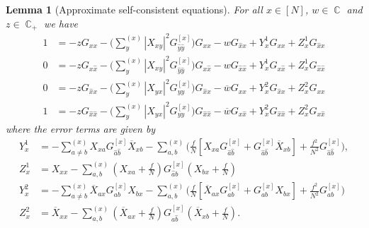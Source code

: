 \documentclass[11pt]{article}
\DeclareMathOperator{\CC}{\mathbb{C}}
\theoremstyle{plain}
\newtheorem{lemma}{Lemma}[section]
\theoremstyle{remark}
\numberwithin{equation}{section}
\newcommand*\barr[1]{\overline{#1}}
\newcommand*\bset[1]{[#1]}
\newcommand*\ubarr[1]{{\widehat{#1}}}
\begin{document}
	\begin{lemma}[Approximate self-consistent equations]\label{lem:ASCEq}
		For all $x\in[N]$, $w \in \CC$ and $z \in \CC_+$ we have
		\begin{align*}
			1 &= -z G_{xx} - \bigg(\sum_{y}^{(x)} |X_{xy}|^{2}G^{\bset{x}}_{\ubarr{y}\ubarr{y}}\bigg) G_{xx} - w G_{ \ubarr{x}x}+ Y^1_{x} G_{xx} + Z^{1}_{x}G_{ \ubarr{x}x}\\
			0 &= -z G_{x\ubarr{x}} - \bigg(\sum_{y}^{(x)} |X_{xy}|^{2}G^{\bset{x}}_{\ubarr{y}\ubarr{y}}\bigg) G_{x\ubarr{x}} - w G_{ \ubarr{x}\ubarr{x}} + Y^1_{x} G_{x\ubarr{x}} + Z^{1}_{x}G_{ \ubarr{x}\ubarr{x}}\\
			0 &=  -z G_{\ubarr{x}x} - \bigg(\sum_{y}^{(x)} |X_{yx}|^{2}G^{\bset{x}}_{yy}\bigg) G_{\ubarr{x}x} -\barr{w} G_{xx} + Y^2_{x} G_{\ubarr{x}x} + Z^{2}_{x}G_{ xx}\\
			1 &=  -z G_{\ubarr{x}\ubarr{x}} - \bigg(\sum_{y}^{(x)} |X_{yx}|^{2}G^{\bset{x}}_{yy}\bigg) G_{\ubarr{x}\ubarr{x}} -\barr{w} G_{x\ubarr{x}} + Y^2_{x} G_{\ubarr{x}\ubarr{x}} + Z^{2}_{x}G_{ x\ubarr{x}}
		\end{align*}
		where the error terms are given by
		\begin{align*}
			Y_{x}^1 &= - \sum_{a \neq b}^{(x)} X_{xa} G^{\bset{x}}_{\ubarr{a}\ubarr{b}} \barr{X}_{xb}  - \sum_{a,b}^{(x)} \biggl(\frac{f}{N}\left[X_{xa} G_{\ubarr{a}\ubarr{b}}^{\bset{x}} + G_{\ubarr{a}\ubarr{b}}^{\bset{x}} \barr{X}_{xb} \right] + \frac{f^2}{N^2}G_{\ubarr{a}\ubarr{b}}^{\bset{x}}\biggr) ,\\
			Z_x^1 &=X_{xx} - \sum_{a,b}^{(x)} \left(X_{xa} + \frac{f}{N} \right) G_{\ubarr{a}b}^{\bset{x}} \left(X_{bx} + \frac{f}{N}\right)\\
			Y_{x}^2 &= - \sum_{a\neq b}^{(x)} \barr{X}_{ax} G_{ab}^{\bset{x}}X_{bx} - \sum_{a,b}^{(x)} \biggl(\frac{f}{N}\left[\barr{X}_{ax} G_{ab}^{\bset{x}} + G_{ab}^{\bset{x}} X_{bx} \right] + \frac{f^2}{N^2}G_{ab}^{\bset{x}}\biggr) \\
			Z_x^2 &= \barr{X}_{xx} - \sum_{a,b}^{(x)}\left(\barr{X}_{ax} + \frac{f}{N} \right) G_{a\ubarr{b}}^{\bset{x}} \left(\barr{X}_{xb} + \frac{f}{N}\right).
		\end{align*}
	\end{lemma}
	
\end{document}
